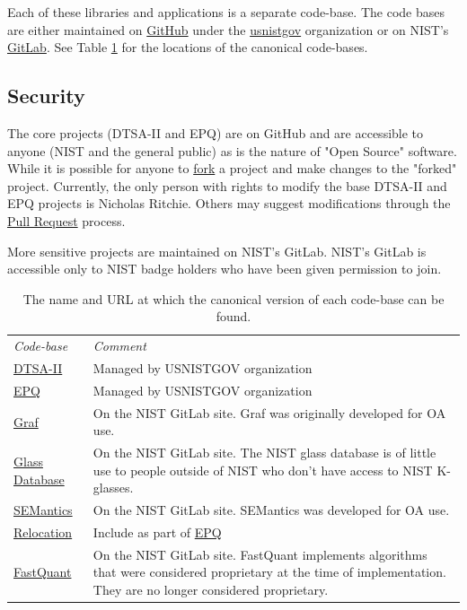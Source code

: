 \documentclass{article}
\begin{document}
Each of these libraries and applications is a separate code-base.  The code bases are either maintained on \href{https://github.com/}{GitHub} under the \href{https://github.com/usnistgov}{usnistgov} organization or on NIST's \href{https://gitlab.nist.gov}{GitLab}.  See Table \ref{tab:code_urls} for the locations of the canonical code-bases.

\subsection{Security}
The core projects (DTSA-II and EPQ) are on GitHub and are accessible to anyone (NIST and the general public) as is the nature of "Open Source" software.  While it is possible for anyone to \href{https://docs.github.com/en/pull-requests/collaborating-with-pull-requests/working-with-forks/fork-a-repo}{fork} a project and make changes to the "forked" project.  Currently, the only person with rights to modify the base DTSA-II and EPQ projects is Nicholas Ritchie.  Others may suggest modifications through the \href{https://github.blog/developer-skills/github-education/beginners-guide-to-github-merging-a-pull-request/}{Pull Request} process.

More sensitive projects are maintained on NIST's GitLab.  NIST's GitLab is accessible only to NIST badge holders who have been given permission to join.

\begin{table}[t]
    \centering
    \begin{tabular}{p{96pt}p{225pt}}
        \emph{Code-base} & \emph{Comment} \\
        \href{https://github.com/usnistgov/DTSA-II}{DTSA-II} & Managed by USNISTGOV organization \\
        \href{https://github.com/usnistgov/EPQ}{EPQ} & Managed by USNISTGOV organization \\
        \href{https://gitlab.nist.gov/gitlab/nritchie/graf}{Graf} & On the NIST GitLab site.  Graf was originally developed for OA use. \\
        \href{https://gitlab.nist.gov/gitlab/nritchie/nist-glass-database}{Glass Database} & On the NIST GitLab site.  The NIST glass database is of little use to people outside of NIST who don't have access to NIST K-glasses. \\
        \href{https://gitlab.nist.gov/gitlab/nritchie/semantics}{SEMantics} & On the NIST GitLab site.  SEMantics was developed for OA use. \\
        \href{https://github.com/usnistgov/EPQ}{Relocation} & Include as part of \href{https://github.com/usnistgov/EPQ}{EPQ} \\
        \href{https://gitlab.nist.gov/gitlab/nritchie/fastquant}{FastQuant} & On the NIST GitLab site.  FastQuant implements algorithms that were considered proprietary at the time of implementation. They are no longer considered proprietary. \\
    \end{tabular}
    \caption{The name and URL at which the canonical version of each code-base can be found.}
    \label{tab:code_urls}
\end{table}
\end{document}

